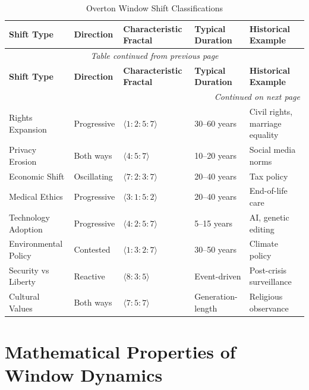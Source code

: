 \begin{center}
\small
\renewcommand{\arraystretch}{1.3}
\begin{longtable}{p{2.2cm}|p{2cm}|p{2.5cm}|p{2cm}|p{3cm}}
\caption{Overton Window Shift Classifications} \\
\toprule
\textbf{Shift Type} & \textbf{Direction} & \textbf{Characteristic Fractal} & \textbf{Typical Duration} & \textbf{Historical Example} \\
\midrule
\endfirsthead
\multicolumn{5}{c}{\textit{Table continued from previous page}} \\
\toprule
\textbf{Shift Type} & \textbf{Direction} & \textbf{Characteristic Fractal} & \textbf{Typical Duration} & \textbf{Historical Example} \\
\midrule
\endhead
\midrule
\multicolumn{5}{r}{\textit{Continued on next page}} \\
\endfoot
\bottomrule
\endlastfoot
Rights Expansion & Progressive & $\langle 1:2:5:7 \rangle$ & 30--60 years & Civil rights, marriage equality \\
Privacy Erosion & Both ways & $\langle 4:5:7 \rangle$ & 10--20 years & Social media norms \\
Economic Shift & Oscillating & $\langle 7:2:3:7 \rangle$ & 20--40 years & Tax policy \\
Medical Ethics & Progressive & $\langle 3:1:5:2 \rangle$ & 20--40 years & End-of-life care \\
Technology Adoption & Progressive & $\langle 4:2:5:7 \rangle$ & 5--15 years & AI, genetic editing \\
Environmental Policy & Contested & $\langle 1:3:2:7 \rangle$ & 30--50 years & Climate policy \\
Security vs Liberty & Reactive & $\langle 8:3:5 \rangle$ & Event-driven & Post-crisis surveillance \\
Cultural Values & Both ways & $\langle 7:5:7 \rangle$ & Generation-length & Religious observance \\
\end{longtable}
\end{center}

\section{Mathematical Properties of Window Dynamics}
\label{sec:overton-properties}

